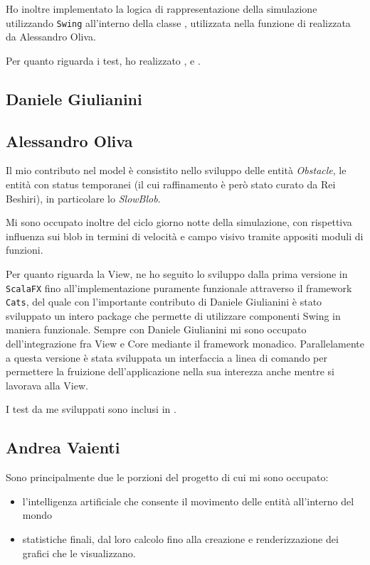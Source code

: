 Ho inoltre implementato la logica di rappresentazione della simulazione utilizzando \texttt{Swing} all'interno della classe , utilizzata nella funzione  di  realizzata da Alessandro Oliva.

Per quanto riguarda i test, ho realizzato ,  e .

\subsection{Daniele Giulianini}

\subsection{Alessandro Oliva}
Il mio contributo nel model è consistito nello sviluppo delle entità \textit{Obstacle}, le entità con status temporanei (il cui raffinamento è però stato curato da Rei Beshiri), in particolare lo \textit{SlowBlob}.

Mi sono occupato inoltre del ciclo giorno notte della simulazione, con rispettiva influenza sui blob in termini di velocità e campo visivo tramite appositi moduli di funzioni.

Per quanto riguarda la View, ne ho seguito lo sviluppo dalla prima versione in \texttt{ScalaFX} fino all'implementazione puramente funzionale attraverso il framework \texttt{Cats}, del quale con l'importante contributo di Daniele Giulianini è stato sviluppato un intero package che permette di utilizzare componenti Swing in maniera funzionale. Sempre con Daniele Giulianini mi sono occupato dell'integrazione fra View e Core mediante il framework monadico. Parallelamente a questa versione è stata sviluppata un interfaccia a linea di comando per permettere la fruizione dell'applicazione nella sua interezza anche mentre si lavorava alla View.

I test da me sviluppati sono inclusi in .

\subsection{Andrea Vaienti}
Sono principalmente due le porzioni del progetto di cui mi sono occupato: 

\begin{itemize}
    \item l'intelligenza artificiale che consente il movimento delle entità all'interno del mondo
    \item statistiche finali, dal loro calcolo fino alla creazione e renderizzazione dei grafici che le visualizzano.
\end{itemize}

